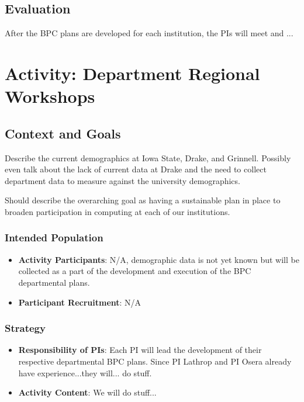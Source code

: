 \documentclass[11pt]{article}
\begin{document}
    \subsection{Evaluation}
    After the BPC plans are developed for each institution, the PIs will meet and ...

\section{Activity: Department Regional Workshops}

\subsection{Context and Goals}
Describe the current demographics at Iowa State, Drake, and Grinnell.
Possibly even talk about the lack of current data at Drake and the need to collect department data to measure against the university demographics.

Should describe the overarching goal as having a sustainable plan in place to broaden participation in computing at each of our institutions.

\subsubsection{Intended Population}
\begin{itemize}
	\item 
	\textbf{Activity Participants}: N/A, demographic data is not yet known but will be collected as a part of the development and execution of the BPC departmental plans.
	
	\item 
	\textbf{Participant Recruitment}: N/A
\end{itemize}

\subsubsection{Strategy}

\begin{itemize}
	\item 
	\textbf{Responsibility of PIs}: Each PI will lead the development of their respective departmental BPC plans.
	Since PI Lathrop and PI Osera already have experience...they will... do stuff.
	
	\item 
	\textbf{Activity Content}:
	We will do stuff...
\end{itemize}
\end{document}

